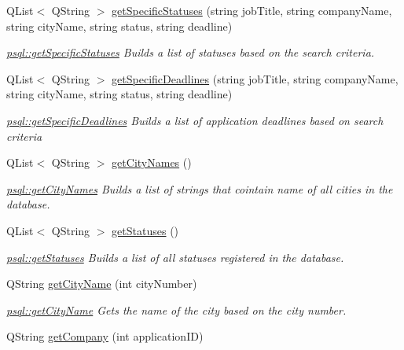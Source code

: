 \begin{DoxyCompactItemize}
Q\+List$<$ Q\+String $>$ \hyperlink{classpsql_a7635c79a1991c8271c813dbf02f7d123}{get\+Specific\+Statuses} (string job\+Title, string company\+Name, string city\+Name, string status, string deadline)
\begin{DoxyCompactList}\small\item\em \hyperlink{classpsql_a7635c79a1991c8271c813dbf02f7d123}{psql\+::get\+Specific\+Statuses} Builds a list of statuses based on the search criteria. \end{DoxyCompactList}\item 
Q\+List$<$ Q\+String $>$ \hyperlink{classpsql_a880551e9e539e52143a35dee2b07bff6}{get\+Specific\+Deadlines} (string job\+Title, string company\+Name, string city\+Name, string status, string deadline)
\begin{DoxyCompactList}\small\item\em \hyperlink{classpsql_a880551e9e539e52143a35dee2b07bff6}{psql\+::get\+Specific\+Deadlines} Builds a list of application deadlines based on search criteria \end{DoxyCompactList}\item 
Q\+List$<$ Q\+String $>$ \hyperlink{classpsql_a42ee0cf90055ba6a7a6f564cf04d8bb8}{get\+City\+Names} ()
\begin{DoxyCompactList}\small\item\em \hyperlink{classpsql_a42ee0cf90055ba6a7a6f564cf04d8bb8}{psql\+::get\+City\+Names} Builds a list of strings that cointain name of all cities in the database. \end{DoxyCompactList}\item 
Q\+List$<$ Q\+String $>$ \hyperlink{classpsql_a14854d28aabc7e658aea87a7b8b52e5c}{get\+Statuses} ()
\begin{DoxyCompactList}\small\item\em \hyperlink{classpsql_a14854d28aabc7e658aea87a7b8b52e5c}{psql\+::get\+Statuses} Builds a list of all statuses registered in the database. \end{DoxyCompactList}\item 
Q\+String \hyperlink{classpsql_a7acc18034ef60c8a1e69b0e1a15d8ab2}{get\+City\+Name} (int city\+Number)
\begin{DoxyCompactList}\small\item\em \hyperlink{classpsql_a7acc18034ef60c8a1e69b0e1a15d8ab2}{psql\+::get\+City\+Name} Gets the name of the city based on the city number. \end{DoxyCompactList}\item 
Q\+String \hyperlink{classpsql_a09745cd03f09ffb2dacacaab4281915f}{get\+Company} (int application\+ID)

\end{DoxyCompactItemize}
